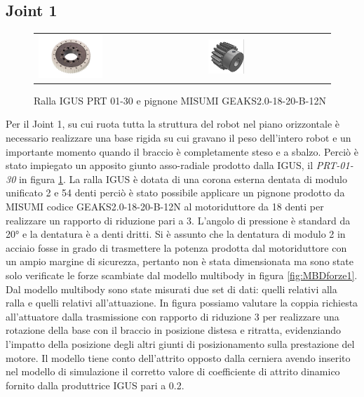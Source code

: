 \documentclass[%
corpo=11pt,
twoside,
 stile=classica,
oldstyle,
greek,%
]{toptesi}
\begin{document}
		\subsection{Joint 1}
		\begin{figure}
			\centering
			\begin{tabular}{ll}
				\includegraphics[width=0.4\textwidth]{pictures/ralla.jpg}
				&
				\includegraphics[width=0.3\textwidth]{pictures/pignone.png}
			\end{tabular}
			\caption{Ralla IGUS PRT 01-30 e pignone MISUMI GEAKS2.0-18-20-B-12N}
			\label{fig:RALLA}
		\end{figure}
		Per il Joint 1, su cui ruota tutta la struttura del robot nel piano orizzontale è necessario realizzare una base rigida su cui gravano il peso dell'intero robot e un importante momento quando il braccio è completamente steso e a sbalzo. Perciò è stato impiegato un apposito giunto asso-radiale prodotto dalla IGUS, il \textit{PRT-01-30} in figura \ref{fig:RALLA}. 
		La ralla IGUS è dotata di una corona esterna dentata di modulo unificato 2 e 54 denti perciò è stato possibile applicare un pignone prodotto da MISUMI codice GEAKS2.0-18-20-B-12N al motoriduttore da 18 denti per realizzare un rapporto di riduzione pari a 3. L'angolo di pressione è standard da 20° e la dentatura è a denti dritti. Si è assunto che la dentatura di modulo 2 in acciaio fosse in grado di trasmettere la potenza prodotta dal motoriduttore con un ampio margine di sicurezza, pertanto non è stata dimensionata ma sono state solo verificate le forze scambiate dal modello multibody in figura \ref{fig:MBDforze1}. \\
		Dal modello multibody sono state misurati due set di dati: quelli relativi alla ralla e quelli relativi all'attuazione. 
		In figura possiamo valutare la coppia richiesta all'attuatore dalla trasmissione con rapporto di riduzione 3 per realizzare una rotazione della base con il braccio in posizione distesa e ritratta, evidenziando l'impatto della posizione degli altri giunti di posizionamento sulla prestazione del motore. 
		Il modello tiene conto dell'attrito opposto dalla cerniera avendo inserito nel modello di simulazione il corretto valore di coefficiente di attrito dinamico fornito dalla produttrice IGUS pari a 0.2. 
\end{document}
